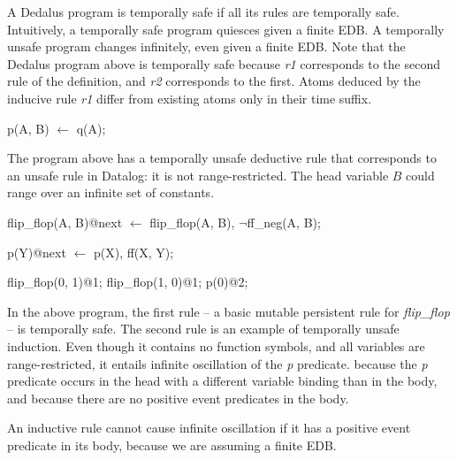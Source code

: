 A Dedalus program is temporally safe if all its rules are temporally safe.
Intuitively, a temporally safe program quiesces given a finite EDB.  A
temporally unsafe program changes infinitely, even given a finite EDB.  Note
that the Dedalus program above is temporally safe because \emph{r1} corresponds
to the second rule of the definition, and \emph{r2} corresponds to the first.
Atoms deduced by the inducive rule \emph{r1} differ from existing atoms only in
their time suffix.

\begin{example}

\begin{Dedalus}
p(A, B) \(\leftarrow\)
  q(A);
\end{Dedalus}

The program above has a temporally unsafe deductive rule that corresponds to an unsafe rule in Datalog: it is not range-restricted.  
The head variable $B$ could range over an infinite set of constants.

\end{example}


\begin{example}


\begin{Dedalus}
flip\_flop(A, B)@next  \(\leftarrow\)
    flip\_flop(A, B),
    \(\lnot\)ff_neg(A, B);

p(Y)@next  \(\leftarrow\)
    p(X),
    ff(X, Y);

flip\_flop(0, 1)@1;
flip\_flop(1, 0)@1;
p(0)@2;
\end{Dedalus}

In the above program, the first rule -- a basic mutable persistent rule for
\emph{flip\_flop} -- is temporally safe.  The second rule is an example of
temporally unsafe induction.  Even though it contains no function symbols, and
all variables are range-restricted, it entails infinite oscillation of
the \emph{p} predicate.
because the \emph{p} predicate occurs in the head with
a different variable binding than in the body, and because there are no
positive event predicates in the body.  

\end{example}


An inductive rule cannot cause infinite oscillation if it has a positive event predicate in its body, because we are assuming a finite EDB.

